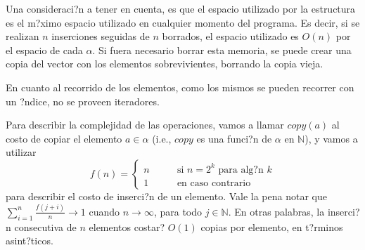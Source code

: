 \documentclass[a4paper,10pt]{article}
\begin{document}

Una consideraci?n a tener en cuenta, es que el espacio utilizado por la estructura es el m?ximo espacio utilizado en cualquier momento del programa.  Es decir, si se realizan $n$ inserciones seguidas de $n$ borrados, el espacio utilizado es $O(n)$ por el espacio de cada $\alpha$.  Si fuera necesario borrar esta memoria, se puede crear una copia del vector con los elementos sobrevivientes, borrando la copia vieja.

En cuanto al recorrido de los elementos, como los mismos se pueden recorrer con un ?ndice, no se proveen iteradores.

Para describir la complejidad de las operaciones, vamos a llamar $copy(a)$ al costo de copiar el elemento $a \in \alpha$ (i.e., $copy$ es una funci?n de $\alpha$ en $\mathbb{N}$), y vamos a utilizar
\[f(n) = \begin{cases} n & \qquad \text{si $n = 2^k$ para alg?n $k$} \\
                      1 & \qquad \text{en caso contrario}
        \end{cases}
\]
para describir el costo de inserci?n de un elemento.  Vale la pena notar que $\displaystyle\sum_{i=1}^n \frac{f(j+i)}{n} \to 1$ cuando $n \to \infty$, para todo $j \in \mathbb{N}$.  En otras palabras, la inserci?n consecutiva de $n$ elementos costar? $O(1)$ copias por elemento, en t?rminos asint?ticos.
\end{document}
